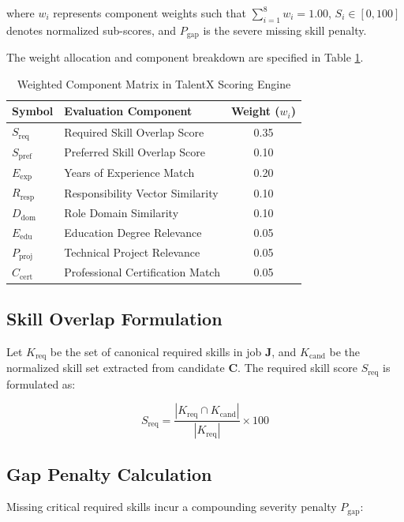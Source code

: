 \documentclass[conference]{IEEEtran}
\begin{document}
where $w_i$ represents component weights such that $\sum_{i=1}^{8} w_i = 1.00$, $S_i \in [0, 100]$ denotes normalized sub-scores, and $P_{\text{gap}}$ is the severe missing skill penalty.

The weight allocation and component breakdown are specified in Table \ref{tab:weights}.

\begin{table}[htbp]
\caption{Weighted Component Matrix in TalentX Scoring Engine}
\begin{center}
\begin{tabular}{llc}
\toprule
\textbf{Symbol} & \textbf{Evaluation Component} & \textbf{Weight ($w_i$)} \\
\midrule
$S_{\text{req}}$ & Required Skill Overlap Score & 0.35 \\
$S_{\text{pref}}$ & Preferred Skill Overlap Score & 0.10 \\
$E_{\text{exp}}$ & Years of Experience Match & 0.20 \\
$R_{\text{resp}}$ & Responsibility Vector Similarity & 0.10 \\
$D_{\text{dom}}$ & Role Domain Similarity & 0.10 \\
$E_{\text{edu}}$ & Education Degree Relevance & 0.05 \\
$P_{\text{proj}}$ & Technical Project Relevance & 0.05 \\
$C_{\text{cert}}$ & Professional Certification Match & 0.05 \\
\bottomrule
\end{tabular}
\label{tab:weights}
\end{center}
\end{table}

\subsection{Skill Overlap Formulation}
Let $K_{\text{req}}$ be the set of canonical required skills in job $\mathbf{J}$, and $K_{\text{cand}}$ be the normalized skill set extracted from candidate $\mathbf{C}$. The required skill score $S_{\text{req}}$ is formulated as:

\begin{equation}
S_{\text{req}} = \frac{|K_{\text{req}} \cap K_{\text{cand}}|}{|K_{\text{req}}|} \times 100
\end{equation}

\subsection{Gap Penalty Calculation}
Missing critical required skills incur a compounding severity penalty $P_{\text{gap}}$:
\end{document}
